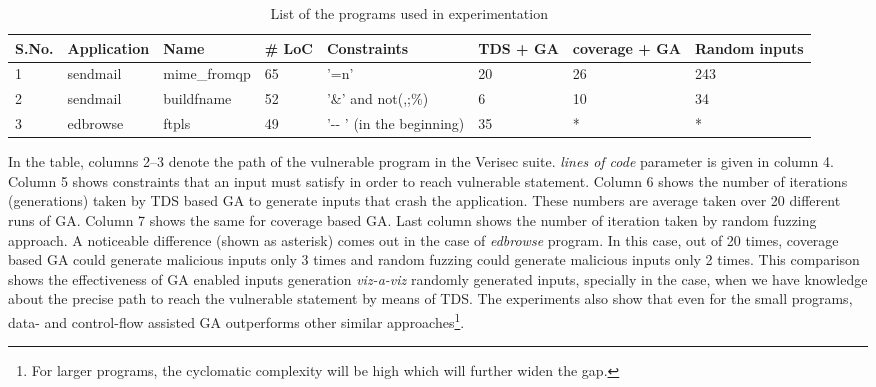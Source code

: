 \begin{table}[h]
\caption{List of the programs used in experimentation}
\scriptsize
\begin{tabular}{p{0.5cm}|p{1.6cm}|p{1.9cm}|p{0.6cm}|p{1.8cm}|p{1.0cm}|p{1.2cm}|p{1.2cm}}
\hline S.No. & Application & Name & \# LoC & Constraints & TDS + GA & coverage + GA & Random inputs \\
\hline 1 & sendmail & mime\_fromqp & 65 &'=n' & 20 & 26 &243\\
       2 & sendmail & buildfname & 52 &'\&' and not(,;\%)  & 6 & 10 & 34\\
       3 & edbrowse & ftpls & 49 & '-{-} ' (in the beginning) & 35 & * & * \\
\hline
 \end{tabular}
\label{tab:result}
\end{table}


In the table, columns 2--3 denote the path of the vulnerable program in the Verisec suite. \emph{lines of code} parameter is given in column 4. Column 5 shows constraints that an input must satisfy in order to reach vulnerable statement. Column 6 shows the number of iterations (generations) taken by TDS based GA to generate inputs that crash the application. These numbers are average taken over 20 different runs of GA. Column 7 shows the same for coverage based GA. Last column shows the number of iteration taken by random fuzzing approach. A noticeable difference (shown as asterisk) comes out in the case of \emph{edbrowse} program. In this case, out of 20 times, coverage based GA could generate malicious inputs only 3 times and random fuzzing could generate malicious inputs only 2 times. This comparison shows the effectiveness of GA enabled inputs generation \emph{viz-a-viz} randomly generated inputs, specially in the case, when we have knowledge about the precise path to reach the vulnerable statement by means of TDS. The experiments also show that even for the small programs, data- and control-flow assisted GA outperforms other similar approaches\footnote{For larger programs, the cyclomatic complexity will be high which will further widen the gap.}.

